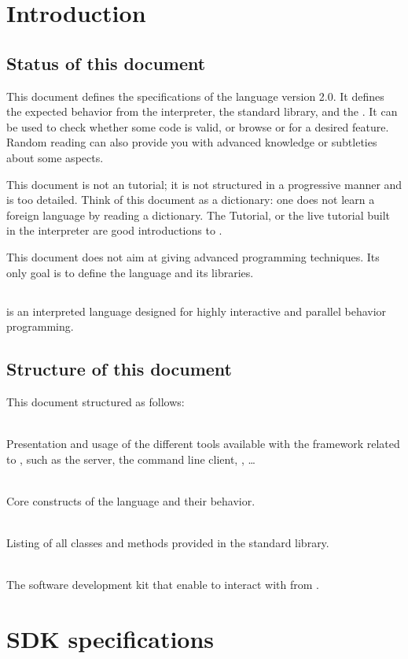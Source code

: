 \chapter*{Introduction}

\section*{Status of this document}

This document defines the specifications of the \us language version
2.0. It defines the expected behavior from the \us interpreter, the
standard library, and the \sdk. It can be used to check whether some code
is valid, or browse \us or \Cxx \api for a desired feature. Random reading
can also provide you with
advanced knowledge or subtleties about some \us aspects.

This document is not an \us tutorial; it is not structured in a
progressive manner and is too
detailed. Think of this document as a dictionary: one does not
learn a foreign language by reading a dictionary. The \us Tutorial, or
the live \us tutorial built in the interpreter are good introductions
to \us.

This document does not aim at giving advanced programming
techniques. Its only goal is to define the language and its
libraries.

\section*{\us}

\dfn[urbiscript@\us]{\us} is an interpreted language designed for highly
interactive and parallel behavior programming. %

\section*{Structure of this document}

This document structured as follows:

\begin{description}
  \newcommand{\xitem}[2]{\item[\autoref{#1} --- #2]~\\}
\xitem{sec:tools}{Tools specifications}%
  Presentation and usage of the different tools available with the
  \urbi framework related to \us, such as the \urbi server, the
  command line client, \umake, \ldots

\xitem{sec:lang}{\us language specifications}%
  Core constructs of the language and their behavior.

\xitem{sec:stdlib}{\us standard library specifications}%
  Listing of all classes and methods provided in the standard library.

\xitem{sec:sdk}{\urbi \sdk specifications}%
  The \urbi software development kit that enable to
  interact with \urbi from \Cxx.
\end{description}


\FloatBarrier

\FloatBarrier

\FloatBarrier

\chapter{\urbi SDK specifications}
\label{sec:sdk}
